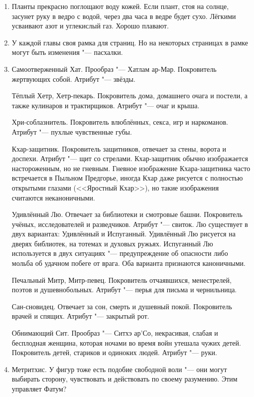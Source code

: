 \begin{enumerate}
\item Планты прекрасно поглощают воду кожей.
Если плант, стоя на солнце, засунет руку в ведро с водой, через два часа в ведре будет сухо.
Лёгкими усваивают азот и углекислый газ.
Хорошо плавают.

\item У каждой главы своя рамка для страниц.
Но на некоторых страницах в рамке могут быть изменения "--- пасхалки.

\item Самоотверженный Хат.
Прообраз "--- Хатлам ар-Мар.
Покровитель жертвующих собой.
Атрибут "--- звёзды.

Тёплый Хетр, Хетр-пекарь.
Покровитель дома, домашнего очага и постели, а также кулинаров и трактирщиков.
Атрибут "--- очаг и крыша.

Хри-соблазнитель.
Покровитель влюблённых, секса, игр и наркоманов.
Атрибут "--- пухлые чувственные губы.

Кхар-защитник.
Покровитель защитников, отвечает за стены, ворота и доспехи.
Атрибут "--- щит со стрелами.
Кхар-защитник обычно изображается настороженным, но не гневным.
Гневное изображение Кхара-защитника часто встречается в Пыльном Предгорье, иногда Кхар даже рисуется с полностью открытыми глазами (<<Яростный Кхар>>), но такие изображения считаются неканоничными.

Удивлённый Лю.
Отвечает за библиотеки и смотровые башни.
Покровитель учёных, исследователей и разведчиков.
Атрибут "--- свиток.
Лю существует в двух вариантах: Удивлённый и Испуганный.
Удивлённый Лю рисуется на дверях библиотек, на тотемах и духовых ружьях.
Испуганный Лю используется в двух ситуациях "--- предупреждение об опасности либо мольба об удачном побеге от врага.
Оба варианта признаются каноничными.

Печальный Митр, Митр-певец.
Покровитель отчаявшихся, менестрелей, поэтов и душевнобольных.
Атрибут "--- перья для письма и чернильница.

Сан-сновидец.
Отвечает за сон, смерть и душевный покой.
Покровитель врачей и спящих.
Атрибут "--- закрытый рот.

Обнимающий Сит.
Прообраз "--- Ситхэ ар'Со, некрасивая, слабая и бесплодная женщина, которая ночами во время войн утешала чужих детей.
Покровитель детей, стариков и одиноких людей.
Атрибут "--- руки.

\item Метритхис.
У фигур тоже есть подобие свободной воли "--- они могут выбирать сторону, чувствовать и действовать по своему разумению.
Этим управляет Фатум?


\end{enumerate}
